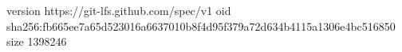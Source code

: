 version https://git-lfs.github.com/spec/v1
oid sha256:fb665ee7a65d523016a6637010b8f4d95f379a72d634b4115a1306e4bc516850
size 1398246
